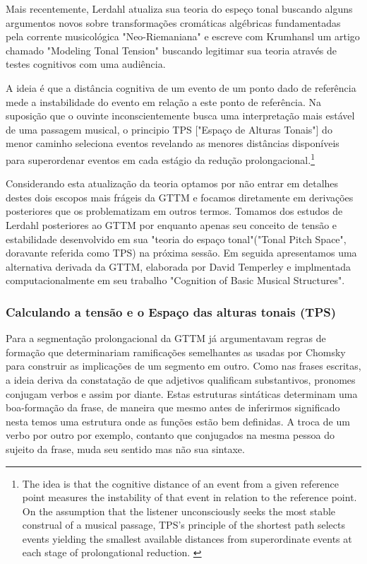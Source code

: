 \documentclass[
	12pt,				%
	openright,			%
	twoside,			%
	a4paper,			%
	english,			%
	french,				%
	spanish,			%
	brazil				%
	]{abntex2}
\begin{document}
Mais recentemente, Lerdahl atualiza sua teoria do espeço tonal\cite{lerdahl2001tonal} buscando alguns argumentos novos sobre transformações cromáticas algébricas fundamentadas pela corrente musicológica "Neo-Riemaniana"\cite{cohn1998introduction,lewin2007generalized} e escreve com Krumhansl um artigo chamado "Modeling Tonal Tension"\cite{2007lerdahl-krumhansl} buscando legitimar sua teoria através de testes cognitivos com uma audiência.


\begin{citacao}
A ideia é que a distância cognitiva de um evento de um ponto dado de referência mede a instabilidade do evento em relação a este ponto de referência. Na suposição que o ouvinte inconscientemente busca uma interpretação mais estável de uma passagem musical, o principio TPS ["Espaço de Alturas Tonais"] do menor caminho seleciona eventos revelando as menores distâncias disponíveis para superordenar eventos em cada estágio da redução prolongacional.\cite[p. 191]{lerdahl2009genesis}\footnote{The idea is that the cognitive distance of an event from a given reference point measures the instability of that
event in relation to the reference point. On the assumption that the listener unconsciously seeks the most stable construal of a musical passage, TPS’s principle of
the shortest path selects events yielding the smallest available distances from superordinate events at each stage of prolongational reduction. \cite[p. 191]{lerdahl2009genesis}}
\end{citacao}

Considerando esta atualização da teoria optamos por não entrar em detalhes destes dois escopos mais frágeis da GTTM e focamos diretamente em derivações posteriores que os problematizam em outros termos. Tomamos dos estudos de Lerdahl posteriores ao GTTM  por enquanto apenas seu conceito de tensão e estabilidade desenvolvido em sua "teoria do espaço tonal"("Tonal Pitch Space", doravante referida como TPS) na próxima sessão. Em seguida apresentamos uma alternativa derivada da GTTM, elaborada por David Temperley e implmentada computacionalmente em seu trabalho "Cognition of Basic Musical Structures"\cite{temperley2004cognition}.




\subsubsection{Calculando a tensão e o Espaço das alturas tonais (TPS) }


Para a segmentação prolongacional da GTTM  já argumentavam regras de formação que determinariam ramificações semelhantes as usadas por Chomsky\cite{chomsky1957syntactic} para construir as implicações de um segmento em outro. Como nas frases escritas, a ideia deriva da constatação de que adjetivos qualificam substantivos, pronomes conjugam verbos e assim por diante. Estas estruturas sintáticas determinam uma boa-formação da frase, de maneira que mesmo antes de inferirmos significado nesta temos uma estrutura onde as funções estão bem definidas. A troca de um verbo por outro por exemplo, contanto que conjugados na mesma pessoa do sujeito da frase, muda seu sentido mas não sua sintaxe.
\end{document}
